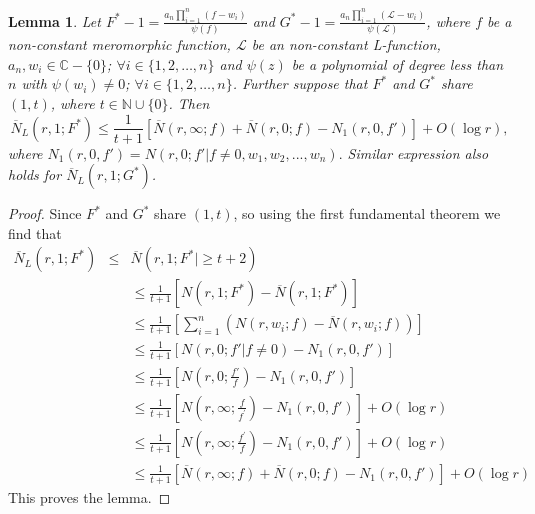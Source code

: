 \documentclass[a4paper,draft]{amsproc}
\theoremstyle{plain}
\newtheorem{lem}{Lemma}[section]
\theoremstyle{definition}
\theoremstyle{remark}
\newcommand{\ol}{\overline}
\newcommand{\be}{\begin{equation}}
\newcommand{\ee}{\end{equation}}
\newcommand{\bea}{\begin{eqnarray}}
\newcommand{\eea}{\end{eqnarray}}
\renewcommand{\d}{\displaystyle}
\numberwithin{equation}{section}
\renewcommand{\leq}{\leqslant}\renewcommand{\geq}{\geqslant}
\begin{document}
\begin{lem}
Let $F^{*}-1=\d\frac{a_{n}\prod\limits_{i=1}^{n}(f-w_{i})}{\psi(f)}$ and $G^{*}-1=\d\frac{a_{n}\prod\limits_{i=1}^{n}(\mathcal{L}-w_{i})}{\psi(\mathcal
{L})}$, where $f$  be a non-constant meromorphic function, $\mathcal{L}$ be an non-constant L-function, $a_{n},w_{i}\in\mathbb{C}-\{0\}$; $\forall i\in\{1,2,\ldots,n\}$ and  $\psi(z)$ be a polynomial of degree less than $n$ with $\psi(w_{i})\neq0$; $\forall i\in\{1,2,\ldots,n\}$. Further suppose that $F^{*}$ and $G^{*}$  share $(1,t)$, where $t\in\mathbb{N}\cup\{0\}$.  Then 
\be\nonumber \ol{N}_L(r,1;F^{*})\leq \frac{1}{t+1}\left[\ol{ N}(r,\infty;f)+\ol{ N}(r,0;f)-N_1(r,0,f')\right]+O(\log r),\ee
where $N_1(r,0,f')=N(r,0;f'|f\ne 0,w_1,w_2,...,w_n).$
Similar expression also holds for $\ol  N_L(r,1;G^{*})$.
\end{lem}
\begin{proof}
Since $F^{*}$ and $G^{*}$  share $(1,t)$, so using the first fundamental theorem we find that
\bea  \ol{ N}_L(r,1;F^{*}) &\leq& \ol{ N}(r,1;F^{*}|\geq t+2)\nonumber\\&&
\leq \frac{1}{t+1}\left[ N(r,1;F^{*})-\ol{ N}(r,1;F^{*})\right]
\nonumber\\&&
\leq \frac{1}{t+1}\left[\sum_{i=1}^{n}\left(N(r,w_i;f)-\ol{ N}(r,w_i;f)\right)\right]	\nonumber\\&&
\leq \frac{1}{t+1}\left[N(r,0;f'|f\ne 0)-N_1(r,0,f')\right]\nonumber\\&&
\leq \frac{1}{t+1}\left[N(r,0;\frac{f'}{f})-N_1(r,0,f')\right]\nonumber\\&&
\leq \frac{1}{t+1}\left[N(r,\infty;\frac{f}{f^{'}})-N_1(r,0,f')\right]+O(\log r)\nonumber\\&&
\leq \frac{1}{t+1}\left[N(r,\infty;\frac{f^{'}}{f})-N_1(r,0,f')\right]+O(\log r)\nonumber\\&&
\leq \frac{1}{t+1}\left[\ol{ N}(r,\infty;f)+\ol{ N}(r,0;f)-N_1(r,0,f')\right]+O(\log r)\nonumber\
\eea %
This proves the lemma.
\end{proof}
\end{document}
